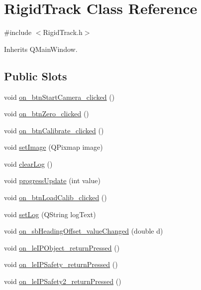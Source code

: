 \hypertarget{class_rigid_track}{}\section{Rigid\+Track Class Reference}
\label{class_rigid_track}


{\ttfamily \#include $<$Rigid\+Track.\+h$>$}



Inherits Q\+Main\+Window.

\subsection*{Public Slots}
\begin{DoxyCompactItemize}
\item 
void \hyperlink{class_rigid_track_a2f226856e28868c8bb1854fa16531f60}{on\+\_\+btn\+Start\+Camera\+\_\+clicked} ()
\item 
void \hyperlink{class_rigid_track_afb1a4edcacc818db4ec6bb017dd07e0f}{on\+\_\+btn\+Zero\+\_\+clicked} ()
\item 
void \hyperlink{class_rigid_track_aed2c39da404909142074f7dd2ce75a63}{on\+\_\+btn\+Calibrate\+\_\+clicked} ()
\item 
void \hyperlink{class_rigid_track_a3b0b3835204cad40abdb144d24aefc76}{set\+Image} (Q\+Pixmap image)
\item 
void \hyperlink{class_rigid_track_a6c99fedc157054f4fb752309457fa848}{clear\+Log} ()
\item 
void \hyperlink{class_rigid_track_a9d229d23fdf40b988a1743accb695ea8}{progress\+Update} (int value)
\item 
void \hyperlink{class_rigid_track_a2224d3f6d923a1c7bad356f49d7a4124}{on\+\_\+btn\+Load\+Calib\+\_\+clicked} ()
\item 
void \hyperlink{class_rigid_track_a54a029af74a21f92749e99df7ed847b2}{set\+Log} (Q\+String log\+Text)
\item 
void \hyperlink{class_rigid_track_a72e338d6bf93d0efa3bc503f7ca736c5}{on\+\_\+sb\+Heading\+Offset\+\_\+value\+Changed} (double d)
\item 
void \hyperlink{class_rigid_track_a9f037a061b2577815fc80e5e9f8d46d9}{on\+\_\+le\+I\+P\+Object\+\_\+return\+Pressed} ()
\item 
void \hyperlink{class_rigid_track_aa527ab3a2ddc7b31bf1063260efc9755}{on\+\_\+le\+I\+P\+Safety\+\_\+return\+Pressed} ()
\item 
void \hyperlink{class_rigid_track_a555c536593d659b940de43cd2db8d6c1}{on\+\_\+le\+I\+P\+Safety2\+\_\+return\+Pressed} ()

\end{DoxyCompactItemize}
